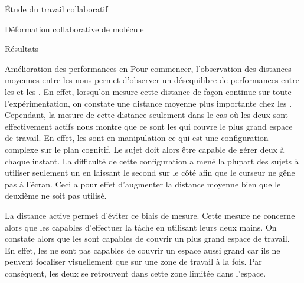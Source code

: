 \documentclass[myfrancais]{mythesis}
\begin{document}
\begin{mypart}{Étude du travail collaboratif}
\begin{mychapter}{Déformation collaborative de molécule}
\begin{mysection}{Résultats}
\begin{mysubsection}{Amélioration des performances en }
					Pour commencer, l'observation des distances moyennes entre les  nous permet d'observer un désequilibre de performances entre  les  et les  .
					En effet, lorsqu'on mesure cette distance de façon continue sur toute l'expérimentation, on constate une distance moyenne plus importante chez les .
					Cependant, la mesure de cette distance seulement dans le cas où les deux  sont effectivement actifs nous montre que ce sont les  qui couvre le plus grand espace de travail.
					En effet, les  sont en manipulation  ce qui est une configuration complexe sur le plan cognitif.
					Le sujet doit alors être capable de gérer deux  à chaque instant.
					La difficulté de cette configuration a mené la plupart des sujets à utiliser seulement un  en laissant le second sur le côté afin que le curseur ne gêne pas à l'écran.
					Ceci a pour effet d'augmenter la distance moyenne bien que le deuxième  ne soit pas utilisé.

					La distance active permet d'éviter ce biais de mesure.
					Cette mesure ne concerne alors que les  capables d'effectuer la tâche en utilisant leurs deux mains.
					On constate alors que les  sont capables de couvrir un plus grand espace de travail.
					En effet, les  ne sont pas capables de couvrir un espace aussi grand car ils ne peuvent focaliser visuellement que sur une zone de travail à la fois.
					Par conséquent, les deux  se retrouvent dans cette zone limitée dans l'espace.


\end{mysubsection}
\end{mysection}
\end{mychapter}
\end{mypart}
\end{document}
